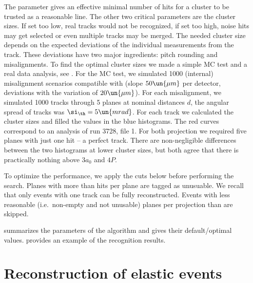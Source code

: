 The  parameter gives an effective minimal number of hits for a cluster to be trusted as a reasonable line. The other two critical parameters are the cluster sizes. If set too low, real tracks would not be recognized, if set too high, noise hits may get selected or even multiple tracks may be merged. The needed cluster size depends on the expected deviations of the individual measurements from the track. These deviations have two major ingredients: pitch rounding and misalignments. To find the optimal cluster sizes we made a simple MC test and a real data analysis, see . For the MC test, we simulated  1000 (internal) misalignment scenarios compatible with  (slope $50\un{\mu m}$ per detector, deviations with the variation of $20\un{\mu m}$). For each misalignment, we simulated 1000 tracks through 5 planes at nominal distances $d$, the angular spread of tracks was $\si_\th = 5\un{mrad}$. For each track we calculated the cluster sizes and filled the values in the blue histograms. The red curves correspond to an analysis of run 3728, file 1. For both projection we required five planes with just one hit -- a perfect track. There are non-negligible differences between the two histograms at lower cluster sizes, but both agree that there is practically nothing above $3a_0$ and $4P$.


To optimize the performance, we apply the cuts below before performing the search.
\bitm
\itm Planes with more than  hits per plane are tagged as unusuable. We recall that only events with one track can be fully reconstructed.
\itm Events with less reasonable (i.e.~non-empty and not unusable) planes per projection than\break {} are skipped.
\eitm

 summarizes the parameters of the algorithm and gives their default/optimal values.  provides an example of the recognition results.




\section[el reco]{Reconstruction of elastic events}


